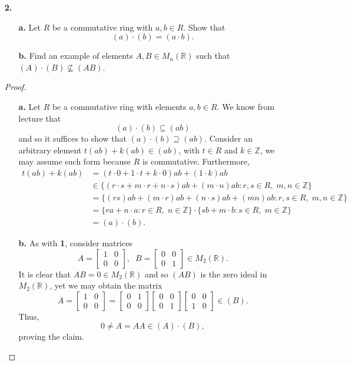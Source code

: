 \documentclass[ 12pt ]{article}
\begin{document}
\begin{enumerate}
	\item[\textbf{2.}]
	\begin{enumerate}
		\item[\textbf{a.}] Let $R$ be a commutative ring with $a, b \in R$. Show that $$(a) \cdot (b) = (a \cdot b).$$
		\item[\textbf{b.}] Find an example of elements $A, B \in M_n(\mathbb{R})$ such that $(A) \cdot (B) \nsubseteq (AB)$.
	\end{enumerate}

		\begin{proof} $ $
			\begin{enumerate}
				\item[\textbf{a.}] Let $R$ be a commutative ring with elements $a, b \in R$. We know from lecture that $$(a) \cdot (b) \subseteq (ab)$$ and so it suffices to show that $(a) \cdot (b) \supseteq (ab)$. Consider an arbitrary element $t (ab) + k (ab) \in (ab)$, with $t \in R$ and $k \in \mathbb{Z}$, we may assume such form because $R$ is commutative. Furthermore,
				\begin{align*}
					t (ab) + k (ab) &= (t \cdot 0 + 1 \cdot t + k \cdot 0) ab + (1 \cdot k) ab \\
					&\in \{ (r \cdot s + m \cdot r + n \cdot s) ab + (m \cdot n) ab : r, s \in R,\; m, n \in \mathbb{Z} \} \\
					&= \{ (rs)ab + (m \cdot r)ab + (n \cdot s)ab + (mn)ab : r, s \in R,\; m, n \in \mathbb{Z} \} \\
					&= \{ ra + n \cdot a : r \in R,\; n \in \mathbb{Z} \} \cdot \{ sb + m \cdot b : s \in R,\; m \in \mathbb{Z} \} \\
					&= (a) \cdot (b).
				\end{align*}

				\item[\textbf{b.}] As with \textbf{1}, consider matrices $$A = \begin{bmatrix} 1 & 0 \\ 0 & 0 \end{bmatrix},\;\; B = \begin{bmatrix} 0 & 0 \\ 0 & 1 \end{bmatrix} \in M_2(\mathbb{R}).$$ It is clear that $AB = 0 \in M_2(\mathbb{R})$ and so $(AB)$ is the zero ideal in $M_2(\mathbb{R})$, yet we may obtain the matrix $$A = \begin{bmatrix} 1 & 0 \\ 0 & 0 \end{bmatrix} = \begin{bmatrix} 0 & 1 \\ 0 & 0 \end{bmatrix} \begin{bmatrix} 0 & 0 \\ 0 & 1 \end{bmatrix} \begin{bmatrix} 0 & 0 \\ 1 & 0 \end{bmatrix} \in (B).$$ Thus, $$0 \neq A = AA \in (A) \cdot (B),$$ proving the claim.
			\end{enumerate}
		\end{proof}



\end{enumerate}
\end{document}
